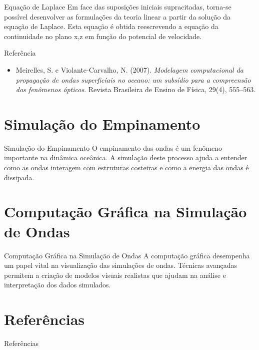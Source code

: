\documentclass[aspectratio=169,xcolor=table]{beamer}
\begin{document}
\begin{frame}{Equação de Laplace}
    Em face das suposições iniciais supracitadas, torna-se possível desenvolver as formulações da teoria linear a partir da solução da equação de Laplace. Esta equação é obtida reescrevendo a equação da continuidade no plano x,z em função do potencial de velocidade.
\end{frame}

\begin{frame}{Referência}
    \begin{itemize}
        \item Meirelles, S. e Violante-Carvalho, N. (2007). \emph{Modelagem computacional da propagação de ondas superficiais no oceano: um subsídio para a compreensão dos fenômenos ópticos}. Revista Brasileira de Ensino de Física, 29(4), 555–563.
    \end{itemize}
\end{frame}

\section{Simulação do Empinamento}
\begin{frame}{Simulação do Empinamento}
    O empinamento das ondas é um fenômeno importante na dinâmica oceânica. A simulação deste processo ajuda a entender como as ondas interagem com estruturas costeiras e como a energia das ondas é dissipada.
\end{frame}

\section{Computação Gráfica na Simulação de Ondas}
\begin{frame}{Computação Gráfica na Simulação de Ondas}
    A computação gráfica desempenha um papel vital na visualização das simulações de ondas. Técnicas avançadas permitem a criação de modelos visuais realistas que ajudam na análise e interpretação dos dados simulados.
\end{frame}

\section{Referências}
\begin{frame}[allowframebreaks]{Referências}
    
    
\end{frame}
\end{document}
